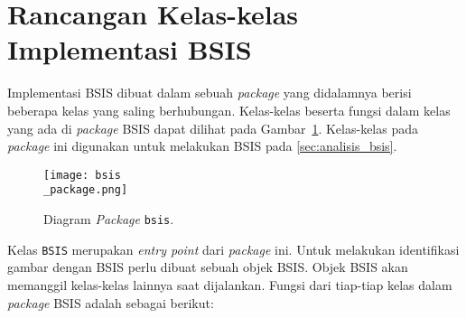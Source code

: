 \section{Rancangan Kelas-kelas Implementasi BSIS}
\label{sec:rancangan_bsis}
Implementasi BSIS dibuat dalam sebuah \textit{package} yang didalamnya berisi beberapa kelas yang saling berhubungan. Kelas-kelas beserta fungsi dalam kelas yang ada di \textit{package} BSIS dapat dilihat pada Gambar~\ref{fig:bsis_package}. Kelas-kelas pada \textit{package} ini digunakan untuk melakukan BSIS pada \ref{sec:analisis_bsis}.
\begin{figure}[H]
	\centering
	\texttt{[image: bsis\\\_package.png]}
	\caption{Diagram \textit{Package} \texttt{bsis}.}
	\label{fig:bsis_package}
\end{figure}
Kelas \texttt{BSIS} merupakan \textit{entry point} dari \textit{package} ini. Untuk melakukan identifikasi gambar dengan BSIS perlu dibuat sebuah objek BSIS. Objek BSIS akan memanggil kelas-kelas lainnya saat dijalankan. Fungsi dari tiap-tiap kelas dalam \textit{package} BSIS adalah sebagai berikut:

